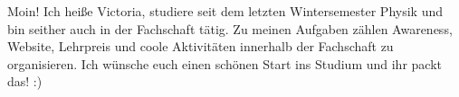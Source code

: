 \begin{multicols}{2}
{
Moin! Ich heiße Victoria, studiere seit dem letzten Wintersemester Physik und bin seither auch in der Fachschaft tätig. Zu meinen Aufgaben zählen Awareness, Website, Lehrpreis und coole Aktivitäten innerhalb der Fachschaft zu organisieren. Ich wünsche euch einen schönen Start ins Studium und ihr packt das! :)
}


\end{multicols}
